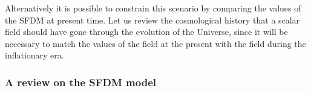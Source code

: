 \documentclass[amssymb,twocolumn,prd,nofootinbib,showpacs]{revtex4-1}
\begin{document}
Alternatively it is possible to constrain this scenario by comparing the values of the SFDM at present time. 
Let us review the cosmological history that a scalar field should have gone through the evolution of the Universe, 
since it will be necessary to match the values of the field at the present with the field during the inflationary era. 

\subsubsection{A review on the SFDM model}
\end{document}
